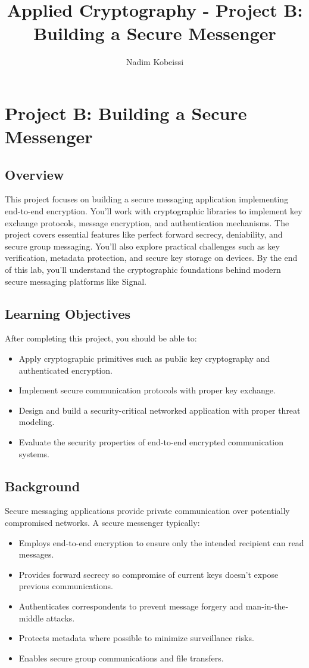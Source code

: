 \documentclass[10pt,a4paper,american]{exam}
\title{Applied Cryptography - Project B: Building a Secure Messenger}
\author{Nadim Kobeissi}
\begin{document}
\classhandoutheader
\section*{Project B: Building a Secure Messenger}

\subsection*{Overview}
This project focuses on building a secure messaging application implementing end-to-end encryption. You'll work with cryptographic libraries to implement key exchange protocols, message encryption, and authentication mechanisms. The project covers essential features like perfect forward secrecy, deniability, and secure group messaging. You'll also explore practical challenges such as key verification, metadata protection, and secure key storage on devices. By the end of this lab, you'll understand the cryptographic foundations behind modern secure messaging platforms like Signal.

\subsection*{Learning Objectives}
After completing this project, you should be able to:
\begin{itemize}
	\item Apply cryptographic primitives such as public key cryptography and authenticated encryption.
	\item Implement secure communication protocols with proper key exchange.
	\item Design and build a security-critical networked application with proper threat modeling.
	\item Evaluate the security properties of end-to-end encrypted communication systems.
\end{itemize}

\subsection*{Background}
Secure messaging applications provide private communication over potentially compromised networks. A secure messenger typically:
\begin{itemize}
	\item Employs end-to-end encryption to ensure only the intended recipient can read messages.
	\item Provides forward secrecy so compromise of current keys doesn't expose previous communications.
	\item Authenticates correspondents to prevent message forgery and man-in-the-middle attacks.
	\item Protects metadata where possible to minimize surveillance risks.
	\item Enables secure group communications and file transfers.
\end{itemize}
\end{document}
